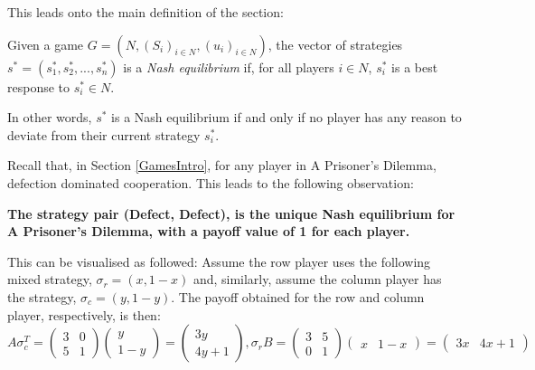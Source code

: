 This leads onto the main definition of the section:
\begin{definition}
    Given a game $G=(N, (S_{i})_{i \in N}, (u_{i})_{i \in N})$, the vector of
    strategies $s^{*} = (s_{1}^{*}, s_{2}^{*}, ..., s_{n}^{*})$ is a
    \textit{Nash equilibrium} if, for all players $i \in N$, $s_{i}^{*}$ is a
    best response to $s_{i}^{*} \in N$. \cite{maschler_solan_zamir_2013}
\end{definition}
In other words, $s^{*}$ is a Nash equilibrium if and only if no player has any
reason to deviate from their current strategy $s_{i}^{*}$.

Recall that, in Section \ref{GamesIntro}, for any player in A Prisoner's
Dilemma, defection dominated cooperation. This leads to the following
observation:
\begin{center}
    \textbf{The strategy pair (Defect, Defect), is the unique Nash equilibrium for A Prisoner's Dilemma, with a payoff value of 1 for each player.} \cite{maschler_solan_zamir_2013}
\end{center}
This can be visualised as followed:
Assume the row player uses the following mixed strategy, $\sigma_{r} = (x, 1-x)$
and, similarly, assume the column player has the strategy, $\sigma_{c} = (y,
1-y)$. The payoff obtained for the row and column player, respectively, is then:
\newline
\begin{math}
    A\sigma_{c}^T = \begin{pmatrix}
        3 & 0 \\
        5 & 1
    \end{pmatrix} \begin{pmatrix}
        y \\
        1-y
    \end{pmatrix} = \begin{pmatrix}
        3y \\
        4y + 1
    \end{pmatrix},

    \sigma_{r}B = \begin{pmatrix}
        3 & 5 \\
        0 & 1        
    \end{pmatrix} \begin{pmatrix}
        x & 1-x
    \end{pmatrix} = \begin{pmatrix}
        3x & 4x + 1
    \end{pmatrix}
\end{math}

